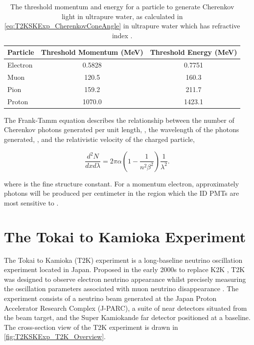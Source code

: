 \begin{table}[ht!]
    \centering
    \begin{tabular}{l|c|c}
      \hline
      Particle & Threshold Momentum (MeV) & Threshold Energy (MeV)\\
      \hline
      Electron & 0.5828 & 0.7751 \\
      Muon & 120.5 & 160.3 \\
      Pion & 159.2 & 211.7 \\
      Proton & 1070.0 & 1423.1 \\
      \hline
      \hline
    \end{tabular}
    \caption{The threshold momentum and energy for a particle to generate Cherenkov light in ultrapure water, as calculated in \autoref{eq:T2KSKExp_CherenkovConeAngle} in ultrapure water which has refractive index .}
    \label{tab:T2KSKExp_CherenkovThreshold}
\end{table}

The Frank-Tamm equation \cite{Frank1991-wj} describes the relationship between the number of Cherenkov photons generated per unit length, , the wavelength of the photons generated, \quickmath{\lambda}, and the relativistic velocity of the charged particle,

\begin{equation}
  \label{eq:T2KSKExp_FrankTammFormula}
  \frac{d^2N}{dxd\lambda} = 2\pi\alpha \left(1 - \frac{1}{n^2 \beta^2} \right)\frac{1}{\lambda^2} .
\end{equation}

where \quickmath{\alpha} is the fine structure constant. For a  momentum electron, approximately  photons will be produced per centimeter in the  region which the ID PMTs are most sensitive to \cite{Fukuda2003-ly}.

\section{The Tokai to Kamioka Experiment}
\label{sec:T2KSKExp_T2K}

The Tokai to Kamioka (T2K) experiment is a long-baseline neutrino oscillation experiment located in Japan. Proposed in the early 2000s \cite{jhf_loi, Itow2001-vw} to replace K2K \cite{The_K2K_Collaboration2001-oo}, T2K was designed to observe electron neutrino appearance whilst precisely measuring the oscillation parameters associated with muon neutrino disappearance \cite{t2k_proposal}. The experiment consists of a neutrino beam generated at the Japan Proton Accelerator Research Complex (J-PARC), a suite of near detectors situated  from the beam target, and the Super Kamiokande far detector positioned at a  baseline. The cross-section view of the T2K experiment is drawn in \autoref{fig:T2KSKExp_T2K_Overview}.

